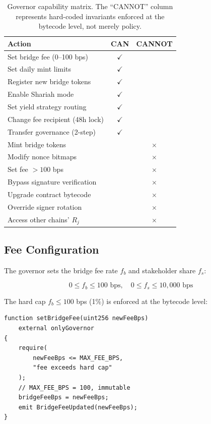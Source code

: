 \begin{table}[h]
\centering
\small
\begin{tabular}{@{}p{3.8cm}cc@{}}
\toprule
\textbf{Action} & \textbf{CAN} & \textbf{CANNOT} \\
\midrule
Set bridge fee (0--100 bps) & $\checkmark$ & \\
Set daily mint limits & $\checkmark$ & \\
Register new bridge tokens & $\checkmark$ & \\
Enable Shariah mode & $\checkmark$ & \\
Set yield strategy routing & $\checkmark$ & \\
Change fee recipient (48h lock) & $\checkmark$ & \\
Transfer governance (2-step) & $\checkmark$ & \\
\midrule
Mint bridge tokens & & $\times$ \\
Modify nonce bitmaps & & $\times$ \\
Set fee $> 100$ bps & & $\times$ \\
Bypass signature verification & & $\times$ \\
Upgrade contract bytecode & & $\times$ \\
Override signer rotation & & $\times$ \\
Access other chains' $R_j$ & & $\times$ \\
\bottomrule
\end{tabular}
\caption{Governor capability matrix. The ``CANNOT'' column represents hard-coded invariants enforced at the bytecode level, not merely policy.}
\label{tab:capability}
\end{table}

\subsection{Fee Configuration}

The governor sets the bridge fee rate $f_b$ and stakeholder share $f_s$:

\begin{equation}
  0 \leq f_b \leq 100 \text{ bps}, \quad 0 \leq f_s \leq 10{,}000 \text{ bps}
\end{equation}

The hard cap $f_b \leq 100$ bps (1\%) is enforced at the bytecode level:

\begin{lstlisting}[language=Solidity,caption=Fee cap enforcement]
function setBridgeFee(uint256 newFeeBps)
    external onlyGovernor
{
    require(
        newFeeBps <= MAX_FEE_BPS,
        "fee exceeds hard cap"
    );
    // MAX_FEE_BPS = 100, immutable
    bridgeFeeBps = newFeeBps;
    emit BridgeFeeUpdated(newFeeBps);
}
\end{lstlisting}

